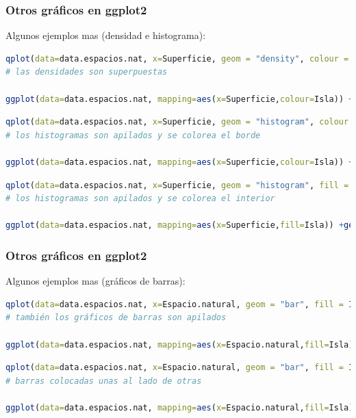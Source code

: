 \documentclass[8pt,ignorenonframetext,]{beamer}
\begin{document}
\begin{frame}[fragile]\frametitle{Otros gráficos en ggplot2}

Algunos ejemplos mas (densidad e histograma):

\begin{lstlisting}[language=R]
qplot(data=data.espacios.nat, x=Superficie, geom = "density", colour = Isla)   
# las densidades son superpuestas
 
ggplot(data=data.espacios.nat, mapping=aes(x=Superficie,colour=Isla)) +geom_density()
\end{lstlisting}

\begin{lstlisting}[language=R]
qplot(data=data.espacios.nat, x=Superficie, geom = "histogram", colour = Isla) 
# los histogramas son apilados y se colorea el borde

ggplot(data=data.espacios.nat, mapping=aes(x=Superficie,colour=Isla)) +geom_histogram()
\end{lstlisting}

\begin{lstlisting}[language=R]
qplot(data=data.espacios.nat, x=Superficie, geom = "histogram", fill = Isla)   
# los histogramas son apilados y se colorea el interior

ggplot(data=data.espacios.nat, mapping=aes(x=Superficie,fill=Isla)) +geom_histogram()
\end{lstlisting}

\end{frame}

\begin{frame}[fragile]\frametitle{Otros gráficos en ggplot2}

Algunos ejemplos mas (gráficos de barras):

\begin{lstlisting}[language=R]
qplot(data=data.espacios.nat, x=Espacio.natural, geom = "bar", fill = Isla) 
# también los gráficos de barras son apilados

ggplot(data=data.espacios.nat, mapping=aes(x=Espacio.natural,fill=Isla)) +geom_bar(position=position_dodge() )
\end{lstlisting}

\begin{lstlisting}[language=R]
qplot(data=data.espacios.nat, x=Espacio.natural, geom = "bar", fill = Isla, position="dodge") 
# barras colocadas unas al lado de otras

ggplot(data=data.espacios.nat, mapping=aes(x=Espacio.natural,fill=Isla)) +geom_bar()
\end{lstlisting}

\end{frame}
\end{document}
